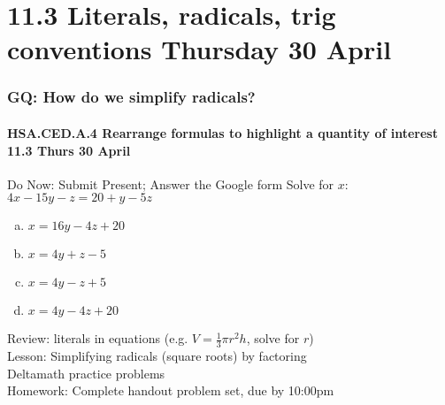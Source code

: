\documentclass{beamer}
\begin{document}
\section{11.3 Literals, radicals, trig conventions Thursday 30 April} 
\frame
{
  \frametitle{GQ: How do we simplify radicals?}
  \framesubtitle{HSA.CED.A.4 Rearrange formulas to highlight a quantity of interest \hfill \alert{11.3 Thurs 30 April}}

  \begin{block}{Do Now: Submit Present; Answer the Google form} \vspace{0.5cm}
    Solve for $x$: $4x-15y-z= 20+y-5z$
    \begin{multicols}{2}
    \begin{enumerate}[(a)]
      \item $x= 16y-4z+20$
      \item $x= 4y+z-5$
      \item $x= 4y-z+5$
      \item $x= 4y-4z+20$
    \end{enumerate}
  \end{multicols}
    \end{block}
    Review: literals in equations (e.g. $V=\frac{1}{3}\pi r^2h$, solve for $r$)\\[0.25cm]
    Lesson: Simplifying radicals (square roots) by factoring\\
    Deltamath practice problems \\[0.25cm]
    Homework: Complete handout problem set, due by 10:00pm}
\end{document}
